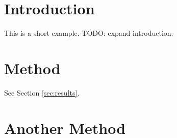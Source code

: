 \section{Introduction}
This is a short example. TODO: expand introduction.

\section{Method}
\label{sec:method}
See Section \ref{sec:results}.

\section{Another Method}
\label{sec:method}
